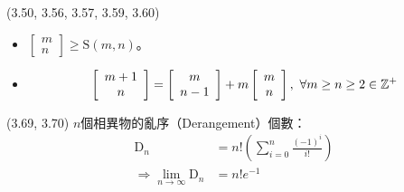 \begin{theorem}{(3.50, 3.56, 3.57, 3.59, 3.60)}
\begin{itemize}
\begin{itemize}
            \item $\left[\begin{array}{c}m\\n\end{array}\right] \ge \text{S}(m, n)$。
            \item \begin{equation}
                \left[\begin{array}{c}m + 1\\n\end{array}\right] = \left[\begin{array}{c}m\\n - 1\end{array}\right] + m\left[\begin{array}{c}m\\n\end{array}\right], \ \forall m \ge n \ge 2 \in \N
            \end{equation}
        \end{itemize}
    \end{itemize}
\end{theorem}

\item \begin{theorem}{(3.69, 3.70)} $n$個相異物的亂序（Derangement）個數：
    \begin{equation}
        \begin{aligned}
            \text{D}_n & = n!(\sum_{i = 0}^{n}\frac{(-1)^i}{i!}) \\
            \Rightarrow \lim_{n \to \infty} \text{D}_n & = n!e^{-1}
        \end{aligned}
    \end{equation}
\end{theorem}
